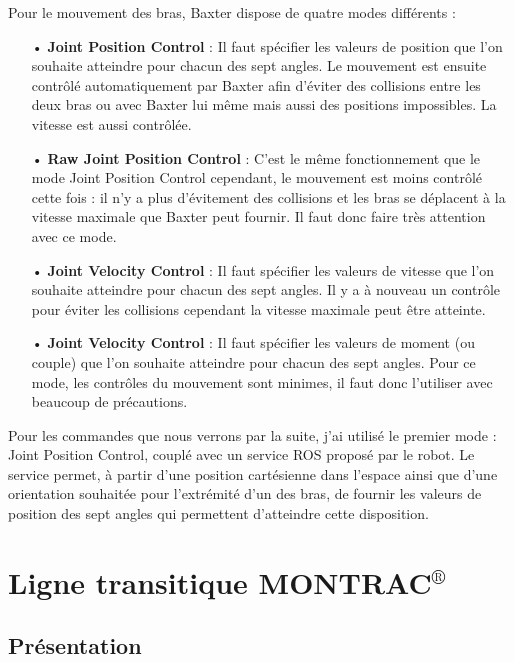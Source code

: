 \documentclass[a4paper,french, titlepage]{book}
\begin{document}
Pour le mouvement des bras, Baxter dispose de quatre modes différents :

\begin{itemize}
\item[ ]
\item[•] \textbf{Joint Position Control} : Il faut spécifier les valeurs de position que l'on souhaite atteindre pour chacun des sept angles. Le mouvement est ensuite contrôlé automatiquement par Baxter afin d'éviter des collisions entre les deux bras ou avec Baxter lui même mais aussi des positions impossibles. La vitesse est aussi contrôlée.
\item[•] \textbf{Raw Joint Position Control} : C'est le même fonctionnement que le mode Joint Position Control cependant, le mouvement est moins contrôlé cette fois : il n'y a plus d'évitement des collisions et les bras se déplacent à la vitesse maximale que Baxter peut fournir. Il faut donc faire très attention avec ce mode.
\item[•] \textbf{Joint Velocity Control} : Il faut spécifier les valeurs de vitesse que l'on souhaite atteindre pour chacun des sept angles. Il y a à nouveau un contrôle pour éviter les collisions cependant la vitesse maximale peut être atteinte.
\item[•] \textbf{Joint Velocity Control} : Il faut spécifier les valeurs de moment (ou couple) que l'on souhaite atteindre pour chacun des sept angles. Pour ce mode, les contrôles du mouvement sont minimes, il faut donc l'utiliser avec beaucoup de précautions.
\item[ ]
\end{itemize}

Pour les commandes que nous verrons par la suite, j'ai utilisé le premier mode : Joint Position Control, couplé avec un service ROS proposé par le robot. Le service permet, à partir d'une position cartésienne dans l'espace ainsi que d'une orientation souhaitée pour l'extrémité d'un des bras, de fournir les valeurs de position des sept angles qui permettent d'atteindre cette disposition.

\section{Ligne transitique MONTRAC$^{\circledR}$}

\subsection{Présentation}
\end{document}
